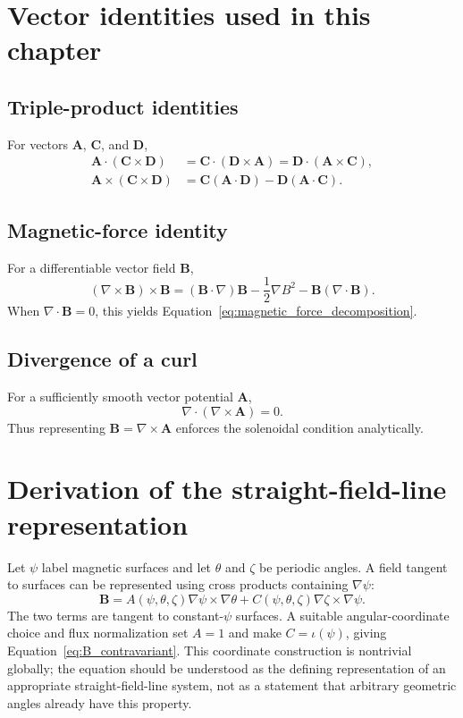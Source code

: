 \appendix

\section{Vector identities used in this chapter}
\label{app:vector_identities}

\subsection{Triple-product identities}
For vectors $\mathbf A$, $\mathbf C$, and $\mathbf D$,
\begin{align}
\mathbf A\cdot(\mathbf C\times\mathbf D)
&=\mathbf C\cdot(\mathbf D\times\mathbf A)
=\mathbf D\cdot(\mathbf A\times\mathbf C),\\
\mathbf A\times(\mathbf C\times\mathbf D)
&=\mathbf C(\mathbf A\cdot\mathbf D)
-\mathbf D(\mathbf A\cdot\mathbf C).
\end{align}

\subsection{Magnetic-force identity}
For a differentiable vector field $\mathbf B$,
\begin{equation}
(\nabla\times\mathbf B)\times\mathbf B
=(\mathbf B\cdot\nabla)\mathbf B
-\frac{1}{2}\nabla B^2
-\mathbf B(\nabla\cdot\mathbf B).
\end{equation}
When $\nabla\cdot\mathbf B=0$, this yields Equation~\eqref{eq:magnetic_force_decomposition}.

\subsection{Divergence of a curl}
For a sufficiently smooth vector potential $\mathbf A$,
\begin{equation}
\nabla\cdot(\nabla\times\mathbf A)=0.
\end{equation}
Thus representing $\mathbf B=\nabla\times\mathbf A$ enforces the solenoidal condition analytically.

\section{Derivation of the straight-field-line representation}
\label{app:straight_field_derivation}

Let $\psi$ label magnetic surfaces and let $\theta$ and $\zeta$ be periodic angles. A field tangent to surfaces can be represented using cross products containing $\nabla\psi$:
\begin{equation}
\mathbf B
=A(\psi,\theta,\zeta)\nabla\psi\times\nabla\theta
+C(\psi,\theta,\zeta)\nabla\zeta\times\nabla\psi.
\end{equation}
The two terms are tangent to constant-$\psi$ surfaces. A suitable angular-coordinate choice and flux normalization set $A=1$ and make $C=\iota(\psi)$, giving Equation~\eqref{eq:B_contravariant}. This coordinate construction is nontrivial globally; the equation should be understood as the defining representation of an appropriate straight-field-line system, not as a statement that arbitrary geometric angles already have this property.

